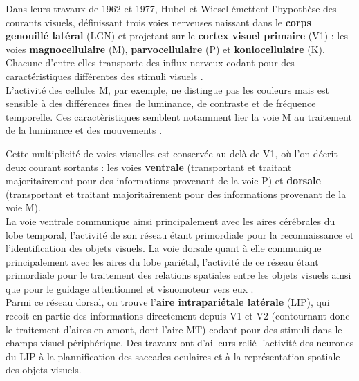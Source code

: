 Dans leurs travaux de 1962 et 1977, Hubel et Wiesel émettent l'hypothèse des courants visuels, définissant trois voies nerveuses naissant dans le \textbf{corps genouillé latéral} (LGN) et projetant sur le \textbf{cortex visuel primaire} (V1) :  les voies \textbf{magnocellulaire} (M),  \textbf{parvocellulaire} (P) et  \textbf{koniocellulaire} (K). Chacune d'entre elles transporte des influx nerveux codant pour des caractéristiques différentes des stimuli visuels \autocite{Denison2014, Werner2014}.\\
L'activité des cellules M, par exemple, ne distingue pas les couleurs mais est sensible à des différences fines de luminance, de contraste et de fréquence temporelle. Ces caractèristiques semblent notamment lier la voie M au traitement de la luminance et des mouvements \autocite{Denison2014, Werner2014}.

Cette multiplicité de voies visuelles est conservée au delà de V1, où l'on décrit deux courant sortants : les voies \textbf{ventrale} (transportant et traitant majoritairement pour des informations provenant de la voie P) et \textbf{dorsale} (transportant et traitant majoritairement pour des informations provenant de la voie M)\autocite{Werner2014, Freeman2011, Goodale2004}.\\
La voie ventrale communique ainsi principalement avec les aires cérébrales du lobe temporal, l'activité de son réseau étant primordiale pour la reconnaissance et l'identification des objets visuels. La voie dorsale quant à elle communique principalement avec les aires du lobe pariétal, l'activité de ce réseau étant primordiale pour le traitement des relations spatiales entre les objets visuels ainsi que pour le guidage attentionnel et visuomoteur vers eux \autocite{Werner2014, Freeman2011, Goodale2004}.\\
Parmi ce réseau dorsal, on trouve l'\textbf{aire intrapariétale latérale} (LIP), qui recoit en partie des informations directement depuis V1 et V2 (contournant donc le traitement d'aires en amont, dont l'aire MT) codant pour des stimuli dans le champs visuel périphérique. Des travaux ont d'ailleurs relié l'activité des neurones du LIP à la plannification des saccades oculaires et à la représentation spatiale des objets visuels.\autocite{Werner2014}


